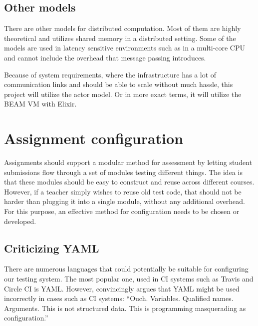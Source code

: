 


\subsection{Other models}

There are other models for distributed computation. Most of them are highly theoretical and utilizes shared memory in a distributed setting. Some of the models are used in latency sensitive environments such as in a multi-core CPU and cannot include the overhead that message passing introduces.

Because of system requirements, where the infrastructure has a lot of communication links and should be able to scale without much hassle, this project will utilize the actor model. Or in more exact terms, it will utilize the BEAM VM with Elixir.

\section{Assignment configuration}

Assignments should support a modular method for assessment by letting student submissions flow through a set of modules testing different things. The idea is that these modules should be easy to construct and reuse across different courses. However, if a teacher simply wishes to reuse old test code, that should not be harder than plugging it into a single module, without any additional overhead. For this purpose, an effective method for configuration needs to be chosen or developed.

\subsection{Criticizing YAML}


There are numerous languages that could potentially be suitable for configuring our testing system.
The most popular one, used in CI systems such as Travis and Circle CI is YAML. However, \cite{JohnsonInYAML} convincingly argues that YAML might be used incorrectly in cases such as CI systems: ``Ouch. Variables. Qualified names. Arguments. This is not structured data. This is programming masquerading as configuration.''


